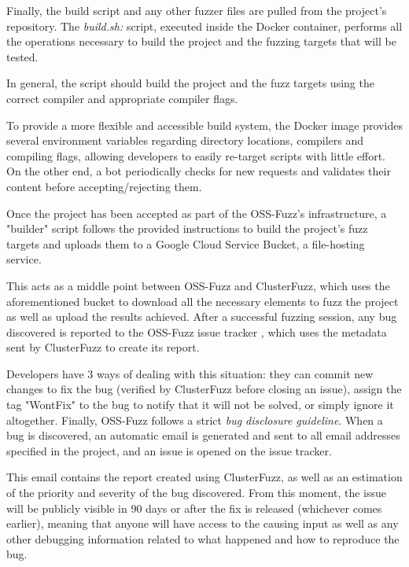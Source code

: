 Finally, the build script and any other fuzzer files are pulled from the project's repository.
The \textit{build.sh:} script, executed inside the Docker container, performs all the operations necessary to build the project and the fuzzing targets that will be tested.

In general, the script should build the project and the fuzz targets using the correct compiler and appropriate compiler flags.

To provide a more flexible and accessible build system, the Docker image provides several environment variables regarding directory locations, compilers and compiling flags, allowing developers to easily re-target scripts with little effort.
On the other end, a bot periodically checks for new requests and validates their content before accepting/rejecting them.



Once the project has been accepted as part of the OSS-Fuzz's infrastructure, a "builder" script follows the provided instructions to build the project's fuzz targets and uploads them to a Google Cloud Service Bucket, a file-hosting service.

This acts as a middle point between OSS-Fuzz and ClusterFuzz, which uses the aforementioned bucket to download all the necessary elements to fuzz the project as well as upload the results achieved.
After a successful fuzzing session, any bug discovered is reported to the OSS-Fuzz issue tracker \cite{ossfuzz_bugtracker}, which uses the metadata sent by ClusterFuzz to create its report. 

Developers have 3 ways of dealing with this situation: they can commit new changes to fix the bug (verified by ClusterFuzz before closing an issue), assign the tag "WontFix" to the bug to notify that it will not be solved, or simply ignore it altogether. 
Finally, OSS-Fuzz follows a strict \textit{bug disclosure guideline}. \cite{bug_disclosure}
When a bug is discovered, an automatic email is generated and sent to all email addresses specified in the project, and an issue is opened on the issue tracker.

This email contains the report created using ClusterFuzz, as well as an estimation of the priority and severity of the bug discovered.
From this moment, the issue will be publicly visible in 90 days or after the fix is released (whichever comes earlier), meaning that anyone will have access to the causing input as well as any other debugging information related to what happened and how to reproduce the bug.

